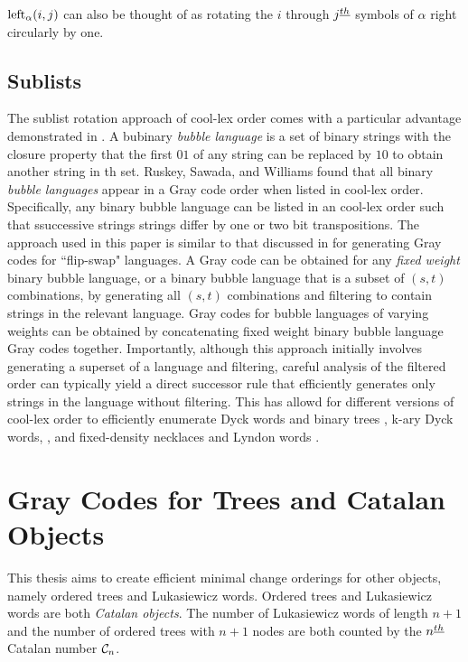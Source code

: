 $\lshiftindex[\alpha]{i}{j}$ can also be thought of as rotating the $i$ through $j\thh$ symbols of $\alpha$ right circularly by one.

\subsection{Sublists}
The sublist rotation approach of cool-lex order comes with a particular advantage demonstrated in \cite{ruskey2012binary}. A bubinary \emph{bubble language} is a set of binary strings with the closure property that the first $01$ of any string can be replaced by $10$ to obtain another string in th set.  Ruskey, Sawada, and Williams found that all binary \emph{bubble languages} appear in a Gray code order when listed in cool-lex order.  Specifically, any binary bubble language can be listed in an cool-lex order such that ssuccessive strings strings differ by one or two bit transpositions.  The approach used in this paper is similar to that discussed in \cite{sawada2021inside} for generating Gray codes for ``flip-swap" languages.  A Gray code can be obtained for any \emph{fixed weight} binary bubble language, or a binary bubble language that is a subset of $(s,t)$ combinations, by generating all $(s,t)$ combinations and filtering to contain strings in the relevant language.  Gray codes for bubble languages of varying weights can be obtained by concatenating fixed weight binary bubble language Gray codes together.
Importantly, although this approach initially involves generating a superset of a language and filtering, careful analysis of the filtered order can typically yield a direct successor rule that efficiently generates only strings in the language without filtering.  This has allowd for different versions of cool-lex order to efficiently enumerate Dyck words and binary trees \cite{ruskey2008generating}, k-ary Dyck words, \cite{durocher2012cool}, and fixed-density necklaces and Lyndon words \cite{sawada2009fixed}.

\section{Gray Codes for Trees and Catalan Objects} \label{sec:intro_Graycodes}

This thesis aims to create efficient minimal change orderings for other objects, namely ordered trees and Lukasiewicz words.  Ordered trees and Lukasiewicz words are both \emph{Catalan objects}.  The number of Lukasiewicz words of length $n+1$ and the number of ordered trees with $n+1$ nodes are both counted by the $n\thh$ Catalan number $\C_n$.  

